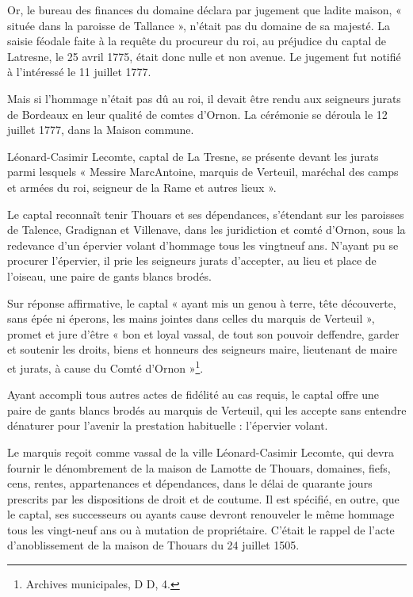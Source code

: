 Or, le bureau des finances du domaine déclara par jugement que ladite maison, « située dans la paroisse de Tallance », n'était pas du domaine de sa majesté. La saisie féodale faite à la requête du procureur du roi, au préjudice du captal de Latresne, le 25 avril 1775, était donc nulle et non avenue. Le jugement fut notifié à l'intéressé le 11 juillet 1777.

Mais si l'hommage n'était pas dû au roi, il devait être rendu aux seigneurs jurats de Bordeaux en leur qualité de comtes d'Ornon. La cérémonie se déroula le 12 juillet 1777, dans la Maison commune.

Léonard-Casimir Lecomte, captal de La Tresne, se présente devant les jurats parmi lesquels « Messire MarcAntoine, marquis de Verteuil, maréchal des camps et armées du roi, seigneur de la Rame et autres lieux ».

Le captal reconnaît tenir Thouars et ses dépendances, s'étendant sur les paroisses de Talence, Gradignan et Villenave, dans les juridiction et comté d'Ornon, sous la redevance d'un épervier volant d'hommage tous les vingtneuf ans. N'ayant pu se procurer l'épervier, il prie les seigneurs jurats d'accepter, au lieu et place de l'oiseau, une paire de gants blancs brodés.

Sur réponse affirmative, le captal « ayant mis un genou à terre, tête découverte, sans épée ni éperons, les mains jointes dans celles du marquis de Verteuil », promet et jure d'être « bon et loyal vassal, de tout son pouvoir deffendre, garder et soutenir les droits, biens et honneurs des seigneurs maire, lieutenant de maire et jurats, à cause du Comté d'Ornon »\footnote{Archives municipales, D D, 4.}.

Ayant accompli tous autres actes de fidélité au cas requis, le captal offre une paire de gants blancs brodés au marquis de Verteuil, qui les accepte sans entendre dénaturer pour l'avenir la prestation habituelle : l'épervier volant.

Le marquis reçoit comme vassal de la ville Léonard-Casimir Lecomte, qui devra fournir le dénombrement de la maison de Lamotte de Thouars, domaines, fiefs, cens, rentes, appartenances et dépendances, dans le délai de quarante jours prescrits par les dispositions de droit et de coutume. Il est spécifié, en outre, que le captal, ses successeurs ou ayants cause devront renouveler le même hommage tous les vingt-neuf ans ou à mutation de propriétaire. C'était le rappel de l'acte d'anoblissement de la maison de Thouars du 24 juillet 1505.

